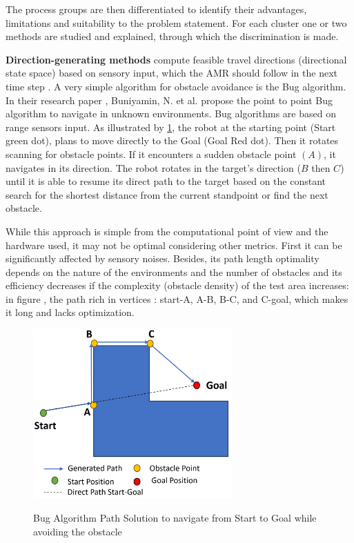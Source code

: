 The process groups are then differentiated to identify their advantages, limitations and suitability 
to the problem statement. For each cluster one or two methods are studied and explained, through which 
the discrimination is made. 

\textbf{Direction-generating methods} compute feasible travel directions (directional state space) 
based on sensory input, which the AMR should follow in the next time step \cite{R28}.
A very simple algorithm for obstacle avoidance is the Bug algorithm.
In their research paper \cite{R25},
Buniyamin, N. et al. propose the point to point Bug algorithm to navigate in unknown environments. 
Bug algorithms are based on range sensors input. As illustrated by \ref{Bug_Algo}, the robot at the 
starting point (Start green dot), 
plans to move directly to the 
Goal (Goal Red dot). Then it rotates scanning for obstacle points. 
If it encounters a sudden obstacle point \((A)\), it navigates in its direction.
The robot rotates in the target's direction (\(B\) then \(C\)) until it is able to resume its direct path to 
the target based on the 
constant search for the shortest distance from the current standpoint or find the next obstacle. 

While this approach is simple from the computational point of view and the hardware used, it may not be 
optimal considering other metrics. First it can be significantly affected by sensory noises.
Besides, its path length optimality depends on the nature of the environments and the number of obstacles 
and its efficiency decreases if the complexity (obstacle density) of the test area increases: in figure 
, the path rich in vertices : start-A, A-B, B-C, and C-goal, which makes it 
long and lacks optimization.

\begin{figure}[H]
    \begin{center}
        \includegraphics[width=3in]{images/Chap1/Bug_Algo.png}\\
        \caption{Bug Algorithm Path Solution to navigate from Start to Goal while avoiding
        the obstacle}
        \label{Bug_Algo}
        \end{center}
\end{figure}

